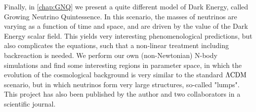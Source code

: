 Finally, in \cref{chap:GNQ} we present a quite different model of Dark Energy, called Growing Neutrino Quintessence. In this scenario, the masses of neutrinos are varying as a function of time and space, and are driven by the value of the Dark Energy scalar field. This yields very interesting phenomenological predictions, but also complicates the equations, such that a non-linear treatment including backreaction is needed. We perform our own (non-Newtonian) N-body simulations and find some interesting regions in parameter space, in which the evolution of the cosmological background is very similar to the standard $\Lambda\mathrm{CDM}$ scenario, but in which neutrinos form very large structures, so-called "lumps". This project has also been published
by the author and two collaborators in a scientific journal.

%
%







 